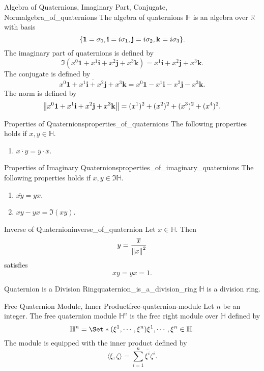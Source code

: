 \documentclass{article}
\begin{document}
\begin{definition}{Algebra of Quaternions, Imaginary Part, Conjugate, Norm}{algebra_of_quaternions}
    The algebra of quaternions $\mathbb{H}$ is an algebra over $\mathbb{R}$ with basis
    \[ \qty{\mathbf{1} = \sigma_0, \mathbf{i} = i \sigma_1, \mathbf{j} = i \sigma_2, \mathbf{k} = i \sigma_3}. \]
    The imaginary part of quaternions is defined by
    \[ \Im(x^0 \mathbf{1} + x^1 \mathbf{i} + x^2 \mathbf{j} + x^3 \mathbf{k}) =  x^1 \mathbf{i} + x^2 \mathbf{j} + x^3 \mathbf{k}. \]
    The conjugate is defined by
    \[ \overline{x^0 \mathbf{1} + x^1 \mathbf{i} + x^2 \mathbf{j} + x^3 \mathbf{k}} =  x^0\mathbf{1} - x^1 \mathbf{i} - x^2 \mathbf{j} - x^3 \mathbf{k}. \]
    The norm is defined by
    \[ \norm{x^0 \mathbf{1} + x^1 \mathbf{i} + x^2 \mathbf{j} + x^3 \mathbf{k}} = (x^1)^2 + (x^2)^2 + (x^3)^2 + (x^4)^2. \]
\end{definition}

\begin{theorem}{Properties of Quaternions}{properties_of_quaternions}
    The following properties holds if $x,y\in\mathbb{H}$.
    \begin{enumerate}
        \item $\overline{x\cdot y} = \overline{y}\cdot \overline{x}$.
    \end{enumerate}
\end{theorem}

\begin{theorem}{Properties of Imaginary Quaternions}{properties_of_imaginary_quaternions}
    The following properties holds if $x,y\in\Im\mathbb{H}$.
    \begin{enumerate}
        \item $\overline{xy} = yx$.
        \item $xy - yx = \Im(xy)$.
    \end{enumerate}
\end{theorem}

\begin{theorem}{Inverse of Quaternion}{inverse_of_quaternion}
    Let $x\in\mathbb{H}$. Then
    \[ y = \frac{\overline{x}}{\norm{x}^2} \]
    satisfies
    \[ x y = y x = 1. \]
\end{theorem}

\begin{theorem}{Quaternion is a Division Ring}{quaternion_is_a_division_ring}
    $\mathbb{H}$ is a division ring.
\end{theorem}

\begin{definition}{Free Quaternion Module, Inner Product}{free-quaternion-module}
    Let $n$ be an integer.
    The free quaternion module $\mathbb{H}^n$ is the free right module over $\mathbb{H}$ defined by
    \[ \mathbb{H}^n = \Set*{(\xi^1,\cdots,\xi^n)}{\xi^1,\cdots,\xi^n\in\mathbb{H}}. \]
    The module is equipped with the inner product defined by
    \[ \langle \xi,\zeta \rangle = \sum_{i=1}^n \overline{\xi^i}\zeta^i. \]
\end{definition}
\end{document}
